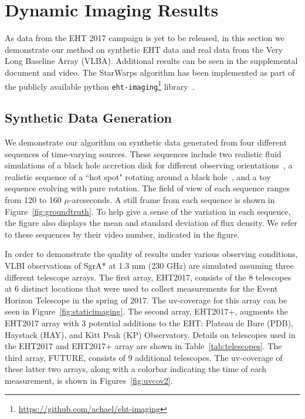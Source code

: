 \section{Dynamic Imaging Results}
\label{sec:results}

As data from the EHT 2017 campaign is yet to be released, in this section we demonstrate our method on synthetic EHT data and real data from the Very Long Baseline Array (VLBA). Additional results can be seen in the supplemental document and video. The StarWarps algorithm has been implemented as part of the publicly available python \texttt{eht-imaging}\footnote{\url{https://github.com/achael/eht-imaging}} library~\cite{andrew}.

\subsection{Synthetic Data Generation} 

We demonstrate our algorithm on synthetic data generated from four different sequences of time-varying sources. These sequences include two realistic fluid simulations of a black hole accretion disk for different observing orientations~\cite{Shiokawa_2013}, a realistic sequence of a ``hot spot" rotating around a black hole~\cite{Broderick_Loeb_2006}, and a toy sequence evolving with pure rotation. The field of view of each sequence ranges from 120 to 160 $\mu$-arcseconds. A still frame from each sequence is shown in Figure~\ref{fig:groundtruth}. To help give a sense of the variation in each sequence, the figure also displays the mean and standard deviation of flux density. We refer to these sequences by their video number, indicated in the figure. 



In order to demonstrate the quality of results under various observing conditions, VLBI observations of SgrA* at 1.3 mm (230 GHz) are simulated assuming
 three different telescope arrays.  The first array, EHT2017, consists of the 8 telescopes at 6 distinct locations that were used to collect measurements for the Event Horizon Telescope in the spring of 2017. The uv-coverage for this array can be seen in Figure~\ref{fig:staticimaging}. The second array, EHT2017+, augments the EHT2017 array with 3 potential additions to the EHT: Plateau de Bure (PDB), Haystack (HAY), and Kitt Peak (KP) Observatory. 
Details on telescopes used in the EHT2017 and EHT2017+ array are shown in Table~\ref{tab:telescopes}.  
The third array, FUTURE, consists of 9 additional telescopes. The uv-coverage of these latter two arrays, along with a colorbar indicating the time of each measurement, is shown in Figures~\ref{fig:uvcov2}. 


